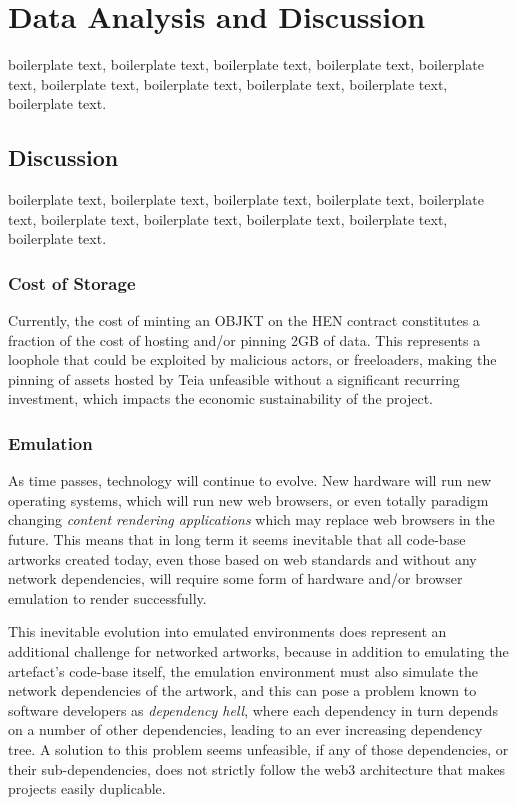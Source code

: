 \chapter{Data Analysis and Discussion}


boilerplate text, boilerplate text, boilerplate text, boilerplate text, boilerplate text, boilerplate text, boilerplate text, boilerplate text, boilerplate text, boilerplate text.






\section{Discussion}


boilerplate text, boilerplate text, boilerplate text, boilerplate text, boilerplate text, boilerplate text, boilerplate text, boilerplate text, boilerplate text, boilerplate text.


\subsection{Cost of Storage}

Currently, the cost of minting an OBJKT on the HEN contract constitutes a fraction of the cost of hosting and/or pinning 2GB of data. This represents a loophole that could be exploited by malicious actors, or freeloaders, making the pinning of assets hosted by Teia unfeasible without a significant recurring investment, which impacts the economic sustainability of the project.

\subsection{Emulation}

As time passes, technology will continue to evolve. New hardware will run new operating systems, which will run new web browsers, or even totally paradigm changing \emph{content rendering applications} which may replace web browsers in the future. This means that in long term it seems inevitable that all code-base artworks created today, even those based on web standards and without any network dependencies, will require some form of hardware and/or browser emulation to render successfully. 

This inevitable evolution into emulated environments does represent an additional challenge for networked artworks, because in addition to emulating the artefact's code-base itself, the emulation environment must also simulate the network dependencies of the artwork, and this can pose a problem known to software developers as \emph{dependency hell}, where each dependency in turn depends on a number of other dependencies, leading to an ever increasing dependency tree. A solution to this problem seems unfeasible, if any of those dependencies, or their sub-dependencies, does not strictly follow the web3 architecture that makes projects easily duplicable.

